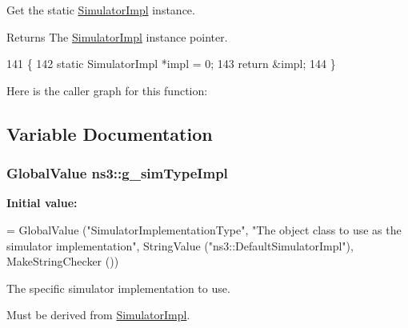 Get the static \hyperlink{classns3_1_1SimulatorImpl}{Simulator\+Impl} instance. 

\begin{DoxyReturn}{Returns}
The \hyperlink{classns3_1_1SimulatorImpl}{Simulator\+Impl} instance pointer. 
\end{DoxyReturn}

\begin{DoxyCode}
141 \{
142   \textcolor{keyword}{static} SimulatorImpl *impl = 0;
143   \textcolor{keywordflow}{return} &impl;
144 \}
\end{DoxyCode}


Here is the caller graph for this function\+:




\subsection{Variable Documentation}
\subsubsection[{\texorpdfstring{g\+\_\+sim\+Type\+Impl}{g_simTypeImpl}}]{\setlength{\rightskip}{0pt plus 5cm}Global\+Value ns3\+::g\+\_\+sim\+Type\+Impl\hspace{0.3cm}{\ttfamily [static]}}\hypertarget{group__simulator_ga590f49e0f2b8bb103fb0415beae2245a}{}\label{group__simulator_ga590f49e0f2b8bb103fb0415beae2245a}
{\bfseries Initial value\+:}
\begin{DoxyCode}
= GlobalValue
  (\textcolor{stringliteral}{"SimulatorImplementationType"},
   \textcolor{stringliteral}{"The object class to use as the simulator implementation"},
   StringValue (\textcolor{stringliteral}{"ns3::DefaultSimulatorImpl"}),
   MakeStringChecker ())
\end{DoxyCode}
The specific simulator implementation to use.

Must be derived from \hyperlink{classns3_1_1SimulatorImpl}{Simulator\+Impl}. 